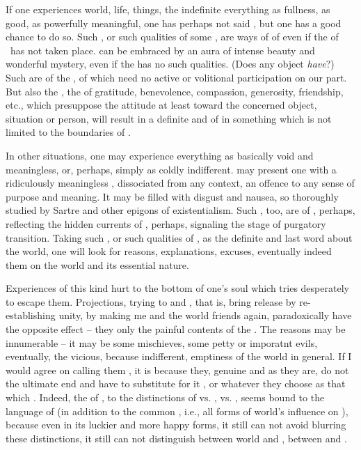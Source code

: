 \pa If one experiences world, life, things, the indefinite everything
as fullness, as good, as powerfully meaningful, one has perhaps not
said \yes, but one has a good chance to do so.  Such ,
or such qualities of some , are ways of 
of  even if the  of \sch\ has not taken place. 
  can be embraced by an aura of
intense beauty and wonderful mystery, even if the 
has no such qualities.  (Does any object {\em have}?)  Such
 are  of the ,  of
 which need no active or volitional participation on our
part.  But also the , the  of gratitude,
benevolence, compassion, generosity, friendship, etc., which
presuppose the  attitude at least toward the 
concerned object, situation or person, will result in a definite and
  of  in something which is
not limited to the boundaries of .

\pa In other situations, one may experience everything as basically
void and meaningless, or, perhaps, simply as coldly indifferent. 
  may present one with a ridiculously
meaningless , dissociated from any context, an offence to
any sense of purpose and meaning.  It may be filled with disgust and
nausea, so thoroughly studied by Sartre and other epigons of
existentialism.  Such , too, are  of
, perhaps, reflecting the hidden currents of
 \No, perhaps, signaling the stage of purgatory
transition.  Taking such , or such qualities of
, as the definite and last word about the world, one
will look for reasons, explanations, excuses, eventually indeed
 them on the world and its essential nature.  

Experiences of this kind hurt to the bottom of one's soul which tries
desperately to escape them.  Projections, trying to  and
, that is, bring release by re-establishing unity, by
making me and the world friends again, paradoxically have the opposite
effect -- they only  the painful contents of the
.  The  reasons may be innumerable -- it
may be some  mischieves, some petty or imporatnt evils,
eventually, the vicious, because indifferent, emptiness of the world
in general.  If I would agree on calling them , it is
because they, genuine and  as they are, do
not  the ultimate end and have to substitute for it
,  or whatever they choose as that
which .  Indeed, the
 of \No,  to the distinctions of  vs. 
,  vs.  , seems bound to the
language of  (in addition to the common
, i.e., all forms of world's influence on ),
because even in its luckier and more happy forms, it still can not
avoid blurring these distinctions, it still can not distinguish
 between world and , between 
and .


